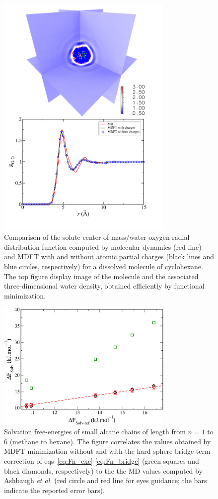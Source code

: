 \documentclass[aip,jcp,showpacs,amsmath,amssymb,superscriptaddress]{revtex4-1}
\begin{document}
\begin{figure}
    \includegraphics[width=8.5cm]{cyclohexane_g_and_dens_with_legend.pdf}
    \caption{
        \label{fig:gr_cyclohexane}
        Comparison of the solute center-of-mass/water oxygen radial distribution function computed by molecular dynamics (red line) and MDFT
        with and without atomic partial charges (black lines and blue circles, respectively) for a dissolved molecule of cyclohexane. The top figure display image of the molecule and the associated three-dimensional water density, obtained efficiently by functional minimization.        }
\end{figure}

\begin{figure}
    \includegraphics[width=8.5cm]{enercomp_alcanes_MD_MDFT.pdf}
    \caption{
        \label{fig:free_energies_alcanes}
        Solvation free-energies of small alcane chains of length from $n=1$ to 6 (methane to hexane). The figure correlates the values obtained by MDFT minimization without and with the hard-sphere bridge term correction of  eqs~\ref{eq:Fn_exc}-\ref{eq:Fn_bridge} (green squares and black diamonds, respectively) to the the MD values computed by Ashbaugh {\em et al.}\cite{ashbaugh_hydration_1998} (red circle and red line for eyes guidance; the bars indicate the reported error bars).         }
\end{figure}
\end{document}
